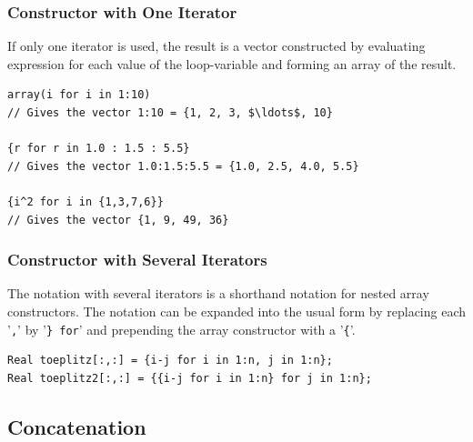 \subsubsection{Constructor with One Iterator}\label{array-constructor-with-one-iterator}\label{constructor-with-one-iterator}

If only one iterator is used, the result is a vector constructed by evaluating expression for each value of the loop-variable and forming an array of the result.

\begin{example}
\begin{lstlisting}[language=modelica]
array(i for i in 1:10)
// Gives the vector 1:10 = {1, 2, 3, $\ldots$, 10}

{r for r in 1.0 : 1.5 : 5.5}
// Gives the vector 1.0:1.5:5.5 = {1.0, 2.5, 4.0, 5.5}

{i^2 for i in {1,3,7,6}}
// Gives the vector {1, 9, 49, 36}
\end{lstlisting}
\end{example}

\subsubsection{Constructor with Several Iterators}\label{array-constructor-with-several-iterators}\label{constructor-with-several-iterators}

The notation with several iterators is a shorthand notation for nested array constructors.
The notation can be expanded into the usual form by replacing each '\lstinline!,!' by '\lstinline!} for!' and prepending the array constructor with a '\lstinline!{!'.

\begin{example}
\begin{lstlisting}[language=modelica]
Real toeplitz[:,:] = {i-j for i in 1:n, j in 1:n};
Real toeplitz2[:,:] = {{i-j for i in 1:n} for j in 1:n};
\end{lstlisting}
\end{example}

\subsection{Concatenation}\label{array-concatenation}\label{concatenation}

